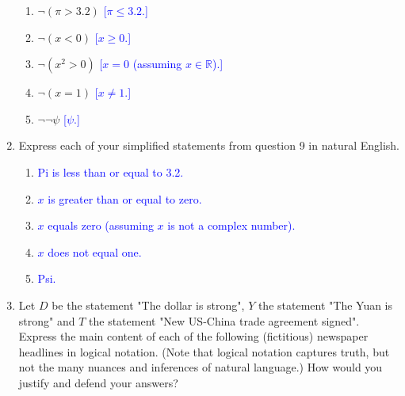\documentclass[13.5pt]{article}
\begin{document}
\begin{enumerate}
\begin{enumerate} 
  \item{\(\neg(\pi>3.2)\)}    \textcolor{blue}{[\(\pi\leq3.2\).]}
  \item{\(\neg(x<0)\)}   \textcolor{blue}{[\(x\geq0\).]}
  \item{\(\neg(x^2>0)\)}   \textcolor{blue}{[\(x=0\) (assuming \(x\in \mathbb{R}\)).]} 
  \item{\(\neg(x=1)\)}   \textcolor{blue}{[\(x\neq1\).]} 
  \item{\(\neg \neg \psi\)}   \textcolor{blue}{[\(\psi\).]} 
\end{enumerate}

\item{Express each of your simplified statements from question 9 in natural English.}

\begin{enumerate}
\item \textcolor{blue}{Pi is less than or equal to 3.2.}
\item \textcolor{blue}{\(x\) is greater than or equal to zero.}
\item \textcolor{blue}{\(x\) equals zero (assuming \(x\) is not a complex number).}
\item \textcolor{blue}{\(x\) does not equal one.}
\item \textcolor{blue}{Psi.}
\end{enumerate}

\item{Let \(D\) be the statement "The dollar is strong", \(Y\) the statement "The Yuan is strong" and \(T\) the statement "New US-China trade agreement signed". Express the main content of each of the following (fictitious) newspaper headlines in logical notation. (Note that logical notation captures truth, but not the many nuances and inferences of natural language.) How would you justify and defend your answers?}


\end{enumerate}
\end{document}
